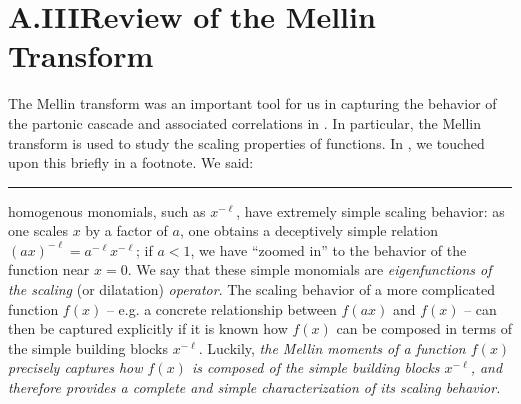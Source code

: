 


\section*{A.III\phantom{V.}Review of the Mellin Transform}
\setcounter{section}{3}


The Mellin transform was an important tool for us in capturing the behavior of the partonic cascade and associated correlations in .
%
In particular, the Mellin transform is used to study the scaling properties of functions.
%
In , we touched upon this briefly in a footnote.
%
We said:

\vspace{7pt}
\hrule
\vspace{7pt}

homogenous monomials, such as \(x^{-\ell}\), have extremely simple scaling behavior:
%
as one scales \(x\) by a factor of \(a\), one obtains a deceptively simple relation \((a x)^{-\ell} = a^{-\ell} x^{-\ell}\);
%
if \(a < 1\), we have ``zoomed in'' to the behavior of the function near \(x = 0\).
%
We say that these simple monomials are \textit{eigenfunctions of the scaling} (or dilatation) \textit{operator}.
%
The scaling behavior of a more complicated function \(f(x)\) -- e.g. a concrete relationship between \(f(ax)\) and \(f(x)\) -- can then be captured explicitly if it is known how \(f(x)\) can be composed in terms of the simple building blocks \(x^{-\ell}\).
%
Luckily, \textit{the Mellin moments of a function \(f(x)\) precisely captures how \(f(x)\) is composed of the simple building blocks \(x^{-\ell}\), and therefore provides a complete and simple characterization of its scaling behavior.}

